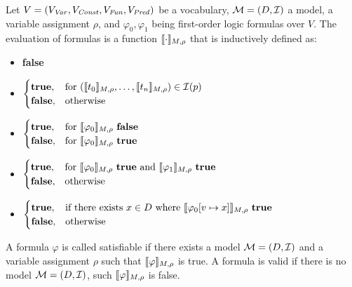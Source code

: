 \begin{mydef}
		Let $V = (V_{\mathit{Var}}, V_{\mathit{Const}}, V_{\mathit{Fun}}, V_{\mathit{Pred}})$ be a vocabulary, $\mathcal{M} = (D, \mathcal{I})$ a model, a variable assignment $\rho$, and $\varphi_0, \varphi_1$ being first-order logic formulas over $V$. The evaluation of formulas is a function $\llbracket \cdot \rrbracket_{M, \rho}$ that is inductively defined as: \\
		\begin{itemize}
			\item {\makebox[3cm]{$\eval{\bot} \hfill$}} \textbf{false}
			\item {} 
				$
				\begin{cases}
					\textbf{true}, & \text{for } (\llbracket t_0 \rrbracket_{M, \rho}, \ldots, \llbracket t_n \rrbracket_{M, \rho}) \in \mathcal{I}(p)\\
					\textbf{false}, & \text{otherwise}
				\end{cases}
				$
			\item {}
				$
				\begin{cases}
					\textbf{true}, & \text{for } \llbracket \varphi_0 \rrbracket_{M, \rho} \text{ \textbf{false}}\\
					\textbf{false}, & \text{for } \llbracket \varphi_0 \rrbracket_{M, \rho} \text{ \textbf{true}}\\
				\end{cases}
				$
			\item {}
				$
				\begin{cases}
					\textbf{true}, & \text{for } \llbracket \varphi_0 \rrbracket_{M, \rho} \text{ \textbf{true} and } \llbracket \varphi_1 \rrbracket_{M, \rho} \text{ \textbf{true}} \\
					\textbf{false}, & \text{otherwise} \\
				\end{cases}
				$
			\item {}
				$
				\begin{cases}
					\textbf{true}, & \text{if there exists } x \in D \text{ where } \llbracket \varphi_0 [v \mapsto x] \rrbracket_{M, \rho} \text{ \textbf{true}} \\
					\textbf{false}, & \text{otherwise} \\
				\end{cases}
				$
		\end{itemize}
\end{mydef}
A formula $\varphi$ is called satisfiable if there exists a model $\mathcal{M} = (D, \mathcal{I})$ and a variable assignment $\rho$ such that $\llbracket \varphi \rrbracket_{M, \rho}$ is true. A formula is valid if there is no model $\mathcal{M} = (D, \mathcal{I})$, such $\llbracket \varphi \rrbracket_{M, \rho}$ is false.
